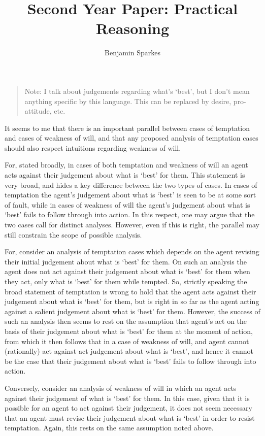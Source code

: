 \documentclass[10pt]{article}
\title{Second Year Paper: Practical Reasoning}
\author{Benjamin Sparkes}
\begin{document}
\begin{quote}
  Note: I talk about judgements regarding what's `best', but I don't mean anything specific by this language.
  This can be replaced by desire, pro-attitude, etc.
\end{quote}

It seems to me that there is an important parallel between cases of temptation and cases of weakness of will, and that any proposed analysis of temptation cases should also respect intuitions regarding weakness of will.

For, stated broadly, in cases of both temptation and weakness of will an agent acts against their judgement about what is `best' for them.
This statement is very broad, and hides a key difference between the two types of cases.
In cases of temptation the agent's judgement about what is `best' is seen to be at some sort of fault, while in cases of weakness of will the agent's judgement about what is `best' fails to follow through into action.
In this respect, one may argue that the two cases call for distinct analyses.
However, even if this is right, the parallel may still constrain the scope of possible analysis.

For, consider an analysis of temptation cases which depends on the agent revising their initial judgement about what is `best' for them.
On such an analysis the agent does not act against their judgement about what is `best' for them when they act, only what is `best' for them while tempted.
So, strictly speaking the broad statement of temptation is wrong to hold that the agent acts against their judgement about what is `best' for them, but is right in so far as the agent acting against a salient judgement about what is `best' for them.
However, the success of such an analysis then seems to rest on the assumption that agent's act on the basis of their judgement about what is `best' for them at the moment of action, from which it then follows that in a case of weakness of will, and agent cannot (rationally) act against act judgement about what is `best', and hence it cannot be the case that their judgement about what is `best' fails to follow through into action.

Conversely, consider an analysis of weakness of will in which an agent acts against their judgement of what is `best' for them.
In this case, given that it is possible for an agent to act against their judgement, it does not seem necessary that an agent must revise their judgement about what is `best' in order to resist temptation.
Again, this rests on the same assumption noted above.
\end{document}
